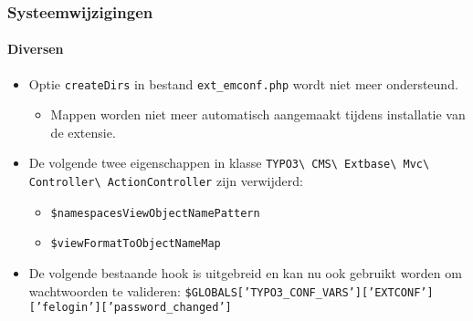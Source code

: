 \begin{frame}[fragile]
	\frametitle{Systeemwijzigingen}
	\framesubtitle{Diversen}

	\begin{itemize}
		\item Optie \texttt{createDirs} in bestand \texttt{ext\_emconf.php} wordt niet meer ondersteund.

			\begin{itemize}\smaller
				\item[\ding{228}] Mappen worden niet meer automatisch aangemaakt tijdens installatie van de extensie.
			\end{itemize}\normalsize

		\item De volgende twee eigenschappen in klasse
			\texttt{TYPO3\textbackslash
				CMS\textbackslash
				Extbase\textbackslash
				Mvc\textbackslash
				Controller\textbackslash
				ActionController}\newline
			zijn verwijderd:

			\begin{itemize}
				\item \texttt{\$namespacesViewObjectNamePattern}
				\item \texttt{\$viewFormatToObjectNameMap}
			\end{itemize}

		\item De volgende bestaande hook is uitgebreid en kan nu
			ook gebruikt worden om wachtwoorden te valideren:\newline
			{\fontsize{8}{10} \selectfont \texttt{\$GLOBALS['TYPO3\_CONF\_VARS']['EXTCONF']['felogin']['password\_changed']}}

	\end{itemize}

\end{frame}


